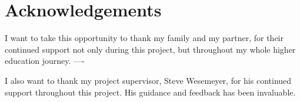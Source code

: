 \chapter*{Acknowledgements}
I want to take this opportunity to thank my family and my partner, for their continued support not only during this project, but throughout my whole higher education journey. ----

I also want to thank my project supervisor, Steve Wesemeyer, for his continued support throughout this project. His guidance and feedback has been invaluable.